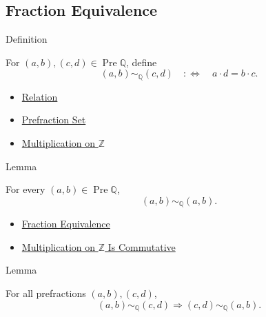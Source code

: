 \subsection*{Fraction Equivalence}

\begin{definitionbox}{Definition}
\begin{definition}
\label{def:fraction-equivalence}
For $(a,b),(c,d)\in\operatorname{Pre}\mathbb{Q}$, define
\[
(a,b)\sim_{\mathbb{Q}}(c,d)
\quad:\Longleftrightarrow\quad
a\cdot d=b\cdot c.
\]
\end{definition}
\end{definitionbox}

\begin{dependencies}
\begin{itemize}
  \item \hyperref[def:relation]{Relation}
  \item \hyperref[def:prefraction-set]{Prefraction Set}
  \item \hyperref[def:multiplication-on-z-classes]{Multiplication on $\mathbb{Z}$}
\end{itemize}
\end{dependencies}

\begin{lemmabox}{Lemma}
\begin{lemma}
\label{lem:fraction-equivalence-reflexive}
For every $(a,b)\in\operatorname{Pre}\mathbb{Q}$,
\[
(a,b)\sim_{\mathbb{Q}}(a,b).
\]
\end{lemma}
\end{lemmabox}

\begin{dependencies}
\begin{itemize}
  \item \hyperref[def:fraction-equivalence]{Fraction Equivalence}
  \item \hyperref[thm:multiplication-on-z-commutative]{Multiplication on $\mathbb{Z}$ Is Commutative}
\end{itemize}
\end{dependencies}

\begin{lemmabox}{Lemma}
\begin{lemma}
\label{lem:fraction-equivalence-symmetric}
For all prefractions $(a,b),(c,d)$,
\[
(a,b)\sim_{\mathbb{Q}}(c,d)
\Longrightarrow
(c,d)\sim_{\mathbb{Q}}(a,b).
\]
\end{lemma}
\end{lemmabox}

